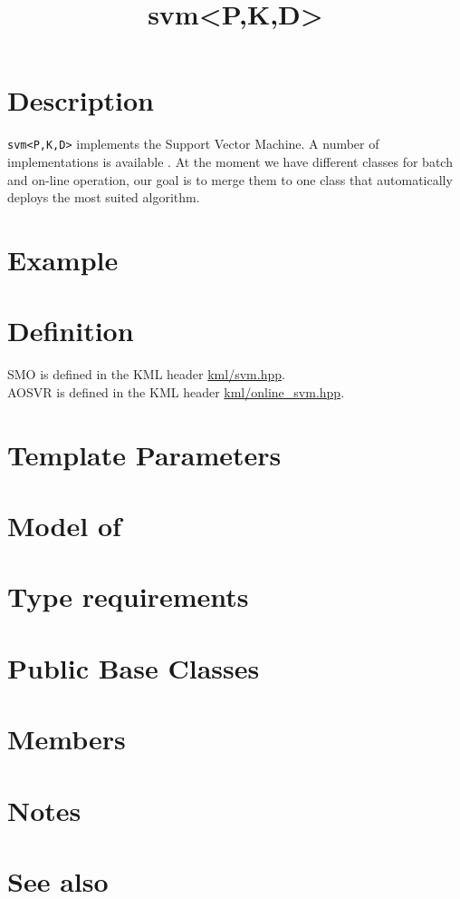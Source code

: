 \documentclass{article}
\begin{document}
\title{svm<P,K,D>}
\maketitle

\section*{Description}

\texttt{svm<P,K,D>} implements the Support Vector Machine. A number of implementations
is available \cite{cauwenberghs00incremental,platt99fast,engel02sparse,ma03accurate}. At the moment we have
different classes for batch and on-line operation, our goal is to 
merge them to one class that automatically deploys the most suited algorithm. 

\section*{Example}
\section*{Definition}


SMO is defined in the KML header \href{\kmlsvnroot/kml/svm.hpp}{kml/svm.hpp}.\\
\noindent AOSVR is defined in the KML header \href{\kmlsvnroot/kml/online_svm.hpp}{kml/online_svm.hpp}.

\section*{Template Parameters}
\section*{Model of}
\section*{Type requirements}
\section*{Public Base Classes}
\section*{Members}
\section*{Notes}
\section*{See also}



\end{document}
